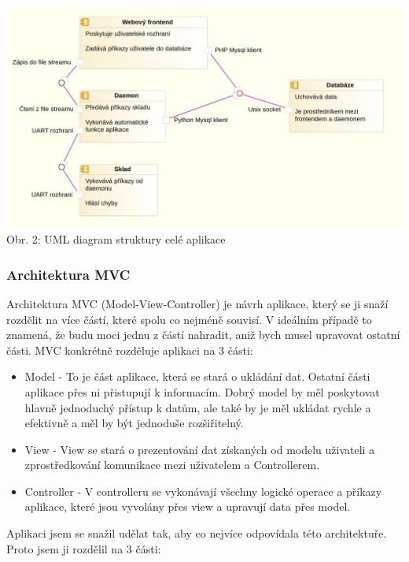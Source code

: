 \documentclass[12pt, a4paper, oneside]{article}
\begin{document}
\begin{minipage}{\textwidth}
\begin{center}
\includegraphics[scale=0.63]{img/overview_uml.png}
\\
\caption{Obr. 2: UML diagram struktury celé aplikace}
\end{center}
\end{minipage}
\vspace{4mm}


\subsubsection{Architektura MVC}

Architektura MVC (Model-View-Controller) je návrh aplikace, který se ji snaží rozdělit na více částí, které spolu co nejméně souvisí.
V ideálním případě to znamená, že budu moci jednu z částí nahradit, aniž bych musel upravovat ostatní části.
MVC konkrétně rozděluje aplikaci na 3 části:

\begin{itemize}
\item Model - To je část aplikace, která se stará o ukládání dat. Ostatní části aplikace přes ni přistupují k informacím.
Dobrý model by měl poskytovat hlavně jednoduchý přístup k datům, ale také by je měl ukládat rychle a efektivně a měl by být jednoduše rozšiřitelný.
\item View - View se stará o prezentování dat získaných od modelu uživateli a zprostředkování komunikace mezi uživatelem a Controllerem.
\item Controller - V controlleru se vykonávají všechny logické operace a příkazy aplikace, které jsou vyvolány přes view a upravují data přes model.
\end{itemize}

Aplikaci jsem se snažil udělat tak, aby co nejvíce odpovídala této architektuře. Proto jsem ji rozdělil na 3 části:
\end{document}
